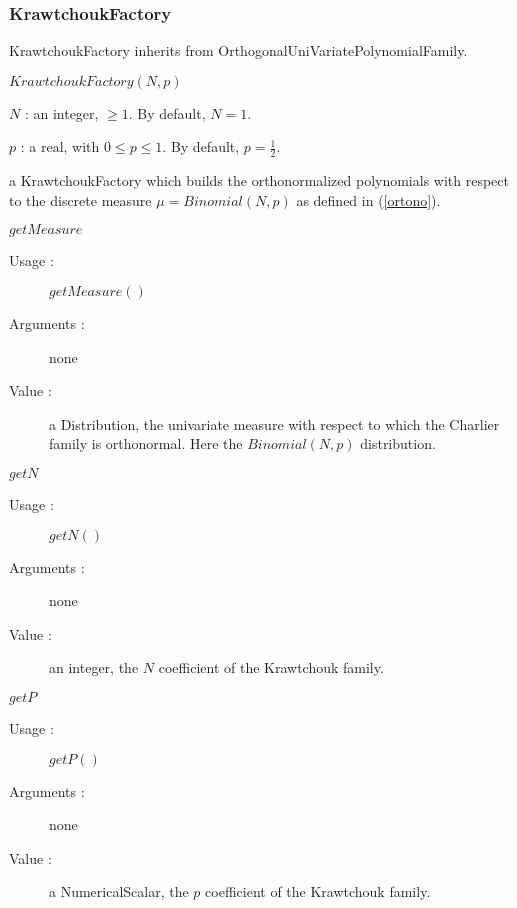 \subsubsection{KrawtchoukFactory}


KrawtchoukFactory inherits from OrthogonalUniVariatePolynomialFamily.

\begin{description}
\item[Usage :] $KrawtchoukFactory(N,p)$


\item[Arguments :]   \rule{0pt}{1em}
  \begin{description}
  \item $N$ : an integer, $\geq 1$. By default, $N=1$.
  \item $p$ : a real, with $0 \leq p \leq 1$. By default, $p=\displaystyle \frac{1}{2}$.
  \end{description}


\item[Value :]  a KrawtchoukFactory which builds the orthonormalized polynomials with respect to the discrete measure $\mu = Binomial(N,p)$ as defined in (\ref{ortono}).

\item[Some methods :]  \rule{0pt}{1em}


  \begin{description}
  \item $getMeasure$
    \begin{description}
    \item[Usage :] $getMeasure()$
    \item[Arguments :] none
    \item[Value :]  a Distribution, the univariate measure with respect to which the Charlier family is orthonormal. Here the $Binomial(N,p)$ distribution.
    \end{description}
    \bigskip

  \item $getN$
    \begin{description}
    \item[Usage :] $getN()$
    \item[Arguments :] none
    \item[Value :]  an integer, the $N$ coefficient of the Krawtchouk family.
    \end{description}
    \bigskip

  \item $getP$
    \begin{description}
    \item[Usage :] $getP()$
    \item[Arguments :] none
    \item[Value :]  a NumericalScalar, the $p$ coefficient of the Krawtchouk family.
    \end{description}

  \end{description}
\end{description}


